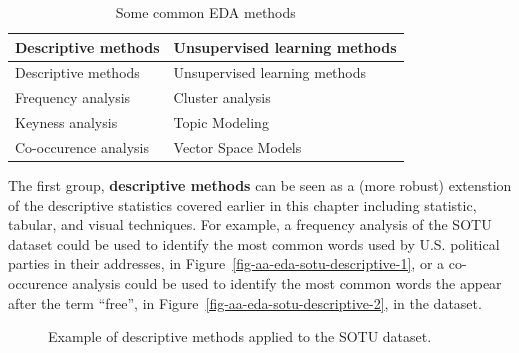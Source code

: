 \documentclass[
  letterpaper,
  DIV=11,
  numbers=noendperiod]{scrreport}
\theoremstyle{definition}
\theoremstyle{remark}
\begin{document}
\hypertarget{tbl-eda-methods}{}
\begin{longtable}[]{@{}ll@{}}
\caption{\label{tbl-eda-methods}Some common EDA methods}\tabularnewline
\toprule\noalign{}
Descriptive methods & Unsupervised learning methods \\
\midrule\noalign{}
\endfirsthead
\toprule\noalign{}
Descriptive methods & Unsupervised learning methods \\
\midrule\noalign{}
\endhead
\bottomrule\noalign{}
\endlastfoot
Frequency analysis & Cluster analysis \\
Keyness analysis & Topic Modeling \\
Co-occurence analysis & Vector Space Models \\
\end{longtable}

The first group, \textbf{descriptive methods} can be seen as a (more
robust) extenstion of the descriptive statistics covered earlier in this
chapter including statistic, tabular, and visual techniques. For
example, a frequency analysis of the SOTU dataset could be used to
identify the most common words used by U.S. political parties in their
addresses, in Figure~\ref{fig-aa-eda-sotu-descriptive-1}, or a
co-occurence analysis could be used to identify the most common words
the appear after the term ``free'', in
Figure~\ref{fig-aa-eda-sotu-descriptive-2}, in the dataset.

\begin{figure}

\begin{minipage}[t]{0.50\linewidth}

{\centering 


}

\end{minipage}%
%
\begin{minipage}[t]{0.50\linewidth}

{\centering 


}

\end{minipage}%

\caption{\label{fig-aa-eda-sotu-descriptive}Example of descriptive
methods applied to the SOTU dataset.}

\end{figure}
\end{document}

